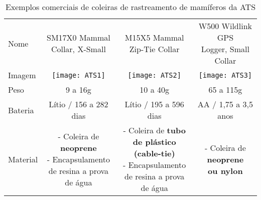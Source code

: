 \begin{table}[h]
\centering
\caption{Exemplos comerciais de coleiras de rastreamento de mamíferos da ATS}
\vspace{0.5cm}
\begin{tabular}{l|ccc}
\hline
Nome & \makecell{SM17X0 Mammal \\ Collar, X-Small} & \makecell{M15X5 Mammal \\ Zip-Tie Collar} & \makecell{W500 Wildlink GPS \\ Logger, Small Collar} \\
Imagem & \texttt{[image: ATS1]} & \texttt{[image: ATS2]} & \texttt{[image: ATS3]} \vspace{0.4cm}\\

Peso & 9 a 16g & 10 a 40g & 65 a 115g \vspace{0.4cm}\\

Bateria & Lítio / 156 a 282 dias & Lítio / 195 a 596 dias & AA / 1,75 a 3,5 anos \vspace{0.4cm} \\

Material & 
\makecell{- Coleira de \\ \textbf{neoprene} \\
- Encapsulamento \\ de resina a prova \\ de água} &
\makecell{ - Coleira de \textbf{tubo} \\ \textbf{de plástico (cable-tie)} \\
- Encapsulamento \\ de resina a prova \\ de água} &
\makecell{- Coleira de \textbf{neoprene} \\ \textbf{ou nylon} }   
\end{tabular}
\end{table}
